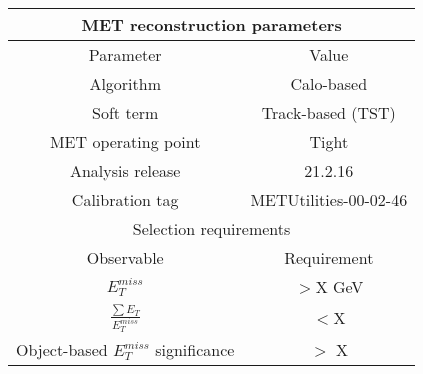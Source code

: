 \begin{table}[ht]
\begin{center}
\begin{tabular}{|c|c|}
\hline
\multicolumn{2}{|c|}{MET reconstruction parameters} \\
\hline
Parameter & Value \\ 
\hline
Algorithm & Calo-based \\
Soft term & Track-based (TST) \\ 
MET operating point & Tight \\
Analysis release & 21.2.16 \\
Calibration tag & METUtilities-00-02-46 \\
\hline
\multicolumn{2}{|c|}{Selection requirements} \\
\hline
Observable & Requirement \\
\hline
$E_{T}^{miss}$  & $>$X GeV \\
$\frac{\sum{E_{T}}}{E_{T}^{miss}}$  & $<$X \\
Object-based $E_{T}^{miss}$ significance & $>$ X \\

\hline
\end{tabular}
\end{center}
\end{table}


